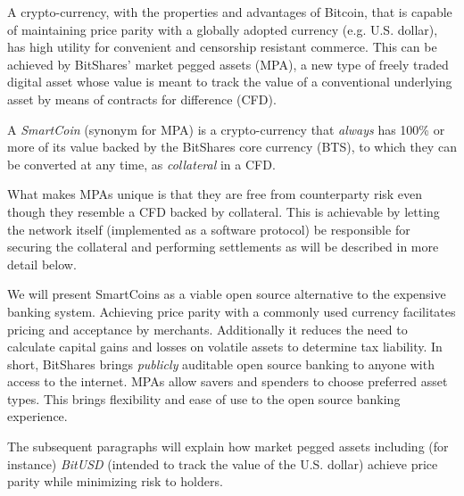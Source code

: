 \label{sec:mpa}

A crypto-currency, with the properties and advantages of Bitcoin, that is
capable of maintaining price parity with a globally adopted currency (e.g.
U.S. dollar), has high utility for convenient and censorship resistant
commerce. This can be achieved by BitShares' market pegged assets (MPA), a new
type of freely traded digital asset whose value is meant to track the value of
a conventional underlying asset by means of contracts for difference (CFD). 

A \emph{SmartCoin} (synonym for MPA) is a crypto-currency that \emph{always}
has 100\% or more of its value backed by the BitShares core currency (BTS), to
which they can be converted at any time, as \emph{collateral} in a CFD.

What makes MPAs unique is that they are free from counterparty risk even though
they resemble a CFD backed by collateral. This is achievable by letting the
network itself (implemented as a software protocol) be responsible for securing
the collateral and performing settlements as will be described in more detail
below.



We will present SmartCoins as a viable open source alternative to the expensive
banking system. Achieving price parity with a commonly used currency
facilitates pricing and acceptance by merchants. Additionally it reduces the
need to calculate capital gains and losses on volatile assets to determine tax
liability. In short, BitShares brings \emph{publicly} auditable open source
banking to anyone with access to the internet. MPAs allow savers and spenders
to choose preferred asset types. This brings flexibility and ease of use to the
open source banking experience.
 
The subsequent paragraphs will explain how market pegged assets including (for
instance) \emph{BitUSD} (intended to track the value of the U.S. dollar)
achieve price parity while minimizing risk to holders.
